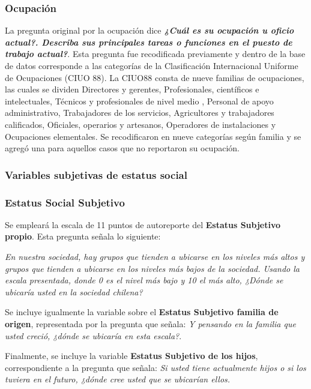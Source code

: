 \documentclass[12pt]{article}
\begin{document}
\newpage
	
\subsubsection*{Ocupación}
	
La pregunta original por la ocupación dice \textit{\textbf{¿Cuál es su ocupación u oficio actual?. Describa sus principales tareas o funciones en el puesto de trabajo actual?}}. Esta pregunta fue recodificada previamente y dentro de la base de datos corresponde a las categorías de la Clasificación Internacional Uniforme de Ocupaciones (CIUO 88). La CIUO88 consta de nueve familias de ocupaciones, las cuales se dividen Directores y gerentes, Profesionales, científicos e intelectuales, Técnicos y profesionales de nivel medio , Personal de apoyo administrativo, Trabajadores de los servicios, Agricultores y trabajadores calificados, Oficiales, operarios y artesanos, Operadores de instalaciones y Ocupaciones elementales. Se recodificaron en nueve categorías según familia y se agregó una para aquellos casos que no reportaron su ocupación.
	
\subsubsection{Variables subjetivas de estatus social }

\subsubsection*{Estatus Social Subjetivo}
	
Se empleará la escala de 11 puntos de autoreporte del \textbf{Estatus Subjetivo propio}. Esta pregunta señala lo siguiente:
	
\textit{En nuestra sociedad, hay grupos que tienden a ubicarse en los niveles más altos y grupos que tienden a ubicarse en los niveles más bajos de la sociedad. Usando la escala presentada, donde 0 es el nivel más bajo y 10 el más alto, ¿Dónde se ubicaría usted en la sociedad chilena?} 
	
Se incluye igualmente la variable sobre el \textbf{Estatus Subjetivo familia de origen}, representada por la pregunta que señala: \textit{Y pensando en la familia que usted creció, ¿dónde se ubicaría en esta escala?}.
	
Finalmente, se incluye la variable \textbf{Estatus Subjetivo de los hijos}, correspondiente a la pregunta que señala: \textit{Si usted tiene actualmente hijos o si los tuviera en el futuro, ¿dónde cree usted que se ubicarían ellos.}
	
\end{document}

